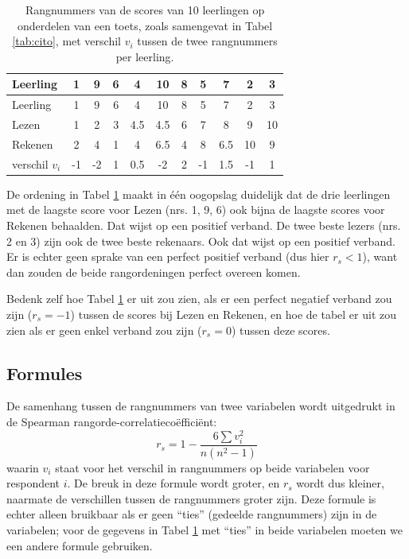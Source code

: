 \documentclass[
]{book}
\begin{document}
\begin{longtable}[]{@{}lcccccccccc@{}}
\caption{\label{tab:cito-rangnummers} Rangnummers van de scores van 10 leerlingen op onderdelen van een toets, zoals samengevat in Tabel \ref{tab:cito}, met verschil \(v_i\) tussen de twee rangnummers per leerling.}\tabularnewline
\toprule
Leerling & 1 & 9 & 6 & 4 & 10 & 8 & 5 & 7 & 2 & 3\tabularnewline
\midrule
\endfirsthead
\toprule
Leerling & 1 & 9 & 6 & 4 & 10 & 8 & 5 & 7 & 2 & 3\tabularnewline
\midrule
\endhead
Lezen & 1 & 2 & 3 & 4.5 & 4.5 & 6 & 7 & 8 & 9 & 10\tabularnewline
Rekenen & 2 & 4 & 1 & 4 & 6.5 & 4 & 8 & 6.5 & 10 & 9\tabularnewline
verschil \(v_i\) & -1 & -2 & 1 & 0.5 & -2 & 2 & -1 & 1.5 & -1 & 1\tabularnewline
\bottomrule
\end{longtable}

De ordening in Tabel \ref{tab:cito-rangnummers} maakt in één oogopslag duidelijk dat
de drie leerlingen met de laagste score voor Lezen (nrs. 1, 9, 6) ook
bijna de laagste scores voor Rekenen behaalden. Dat wijst op een
positief verband. De twee beste lezers (nrs. 2 en 3) zijn ook de twee
beste rekenaars. Ook dat wijst op een positief verband. Er is echter
geen sprake van een perfect positief verband (dus hier \(r_s<1\)), want
dan zouden de beide rangordeningen perfect overeen komen.

Bedenk zelf hoe Tabel \ref{tab:cito-rangnummers} er uit zou zien, als er een perfect
negatief verband zou zijn (\(r_s=-1\)) tussen de scores bij Lezen en
Rekenen, en hoe de tabel er uit zou zien als er geen enkel verband zou
zijn (\(r_s=0\)) tussen deze scores.

\hypertarget{formules-4}{%
\subsection{Formules}\label{formules-4}}

De samenhang tussen de rangnummers van twee variabelen wordt uitgedrukt
in de Spearman rangorde-correlatiecoëfficiënt:
\begin{equation}
    r_s = 1 - \frac{6 \sum v_i^2}{n(n^2-1)}
  \label{eq:spearman}
\end{equation}
waarin \(v_i\) staat voor
het verschil in rangnummers op beide variabelen voor respondent \(i\). De
breuk in deze formule wordt groter, en \(r_s\) wordt dus kleiner, naarmate
de verschillen tussen de rangnummers groter zijn.
Deze formule is echter alleen bruikbaar als er geen ``ties'' (gedeelde rangnummers) zijn in de variabelen; voor de gegevens in Tabel \ref{tab:cito-rangnummers} met ``ties'' in beide variabelen moeten we een andere formule gebruiken.
\end{document}
